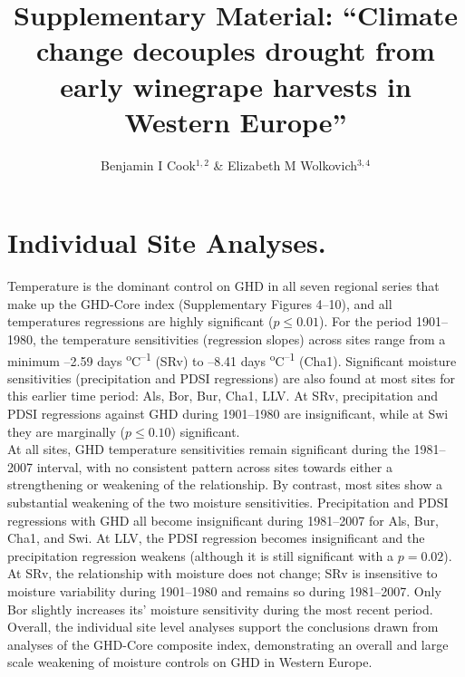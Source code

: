 \documentclass[12pt]{article}
\title{Supplementary Material: 
``Climate change decouples drought from early winegrape harvests in Western Europe''}
\author{Benjamin I Cook$^{1,2}$ \& Elizabeth M Wolkovich$^{3,4}$}
\begin{document}
\maketitle

\section*{Individual Site Analyses.}
\noindent Temperature is the dominant control on GHD in all seven regional series that make up the GHD-Core index (Supplementary Figures 4--10), and all temperatures regressions are highly significant ($p\le0.01$). For the period 1901--1980, the temperature sensitivities (regression slopes) across sites range from a minimum --2.59 days \textsuperscript{o}C\textsuperscript{--1} (SRv) to --8.41 days \textsuperscript{o}C\textsuperscript{--1} (Cha1). Significant moisture sensitivities (precipitation and PDSI regressions) are also found at most sites for this earlier time period: Als, Bor, Bur, Cha1, LLV. At SRv, precipitation and PDSI regressions against GHD during 1901--1980 are insignificant, while at Swi they are marginally ($p\le0.10$) significant.\\
\indent At all sites, GHD temperature sensitivities remain significant during the 1981--2007 interval, with no consistent pattern across sites towards either a strengthening or weakening of the relationship. By contrast, most sites show a substantial weakening of the two moisture sensitivities. Precipitation and PDSI regressions with GHD all become insignificant during 1981--2007 for Als, Bur, Cha1, and Swi. At LLV, the PDSI regression becomes insignificant and the precipitation regression weakens (although it is still significant with a $p=0.02$). At SRv, the relationship with moisture does not change; SRv is insensitive to moisture variability during 1901--1980 and remains so during 1981--2007. Only Bor slightly increases its' moisture sensitivity during the most recent period. Overall, the individual site level analyses support the conclusions drawn from analyses of the GHD-Core composite index, demonstrating an overall and large scale weakening of moisture controls on GHD in Western Europe.
\end{document}
